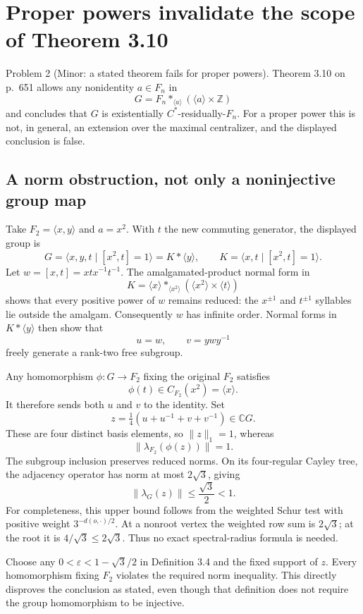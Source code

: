 \documentclass[10pt]{article}
\begin{document}
\section*{Proper powers invalidate the scope of Theorem 3.10}
Problem 2 (Minor: a stated theorem fails for proper powers).  Theorem 3.10 on p. 651 allows any nonidentity \(a\in F_n\) in \[G=F_n*_{\langle a\rangle}(\langle a\rangle\times\mathbb Z)\] and concludes that \(G\) is existentially \(C^*\)-residually-\(F_n\). For a proper power this is not, in general, an extension over the maximal centralizer, and the displayed conclusion is false.\par
\subsection*{A norm obstruction, not only a noninjective group map}
Take \(F_2=\langle x,y\rangle\) and \(a=x^2\). With \(t\) the new commuting generator, the displayed group is \[G=\langle x,y,t\mid[x^2,t]=1\rangle
   =K*\langle y\rangle,\qquad
 K=\langle x,t\mid[x^2,t]=1\rangle.\] Let \(w=[x,t]=xtx^{-1}t^{-1}\). The amalgamated-product normal form in \[K=\langle x\rangle*_{\langle x^2\rangle}
             (\langle x^2\rangle\times\langle t\rangle)\] shows that every positive power of \(w\) remains reduced: the \(x^{\pm1}\) and \(t^{\pm1}\) syllables lie outside the amalgam. Consequently \(w\) has infinite order. Normal forms in \(K*\langle y\rangle\) then show that \[u=w,\qquad v=ywy^{-1}\] freely generate a rank-two free subgroup.\par
Any homomorphism \(\phi:G\to F_2\) fixing the original \(F_2\) satisfies \[\phi(t)\in C_{F_2}(x^2)=\langle x\rangle.\] It therefore sends both \(u\) and \(v\) to the identity. Set \[z=\tfrac14(u+u^{-1}+v+v^{-1})\in\mathbb CG.\] These are four distinct basis elements, so \(\|z\|_1=1\), whereas \[\|\lambda_{F_2}(\phi(z))\|=1.\] The subgroup inclusion preserves reduced norms. On its four-regular Cayley tree, the adjacency operator has norm at most \(2\sqrt3\), giving \[\|\lambda_G(z)\|\le\frac{\sqrt3}{2}<1 .\] For completeness, this upper bound follows from the weighted Schur test with positive weight \(3^{-d(o,\cdot)/2}\). At a nonroot vertex the weighted row sum is \(2\sqrt3\); at the root it is \(4/\sqrt3\le2\sqrt3\). Thus no exact spectral-radius formula is needed.\par
Choose any \(0<\varepsilon<1-\sqrt3/2\) in Definition 3.4 and the fixed support of \(z\). Every homomorphism fixing \(F_2\) violates the required norm inequality. This directly disproves the conclusion as stated, even though that definition does not require the group homomorphism to be injective.\par
\end{document}
